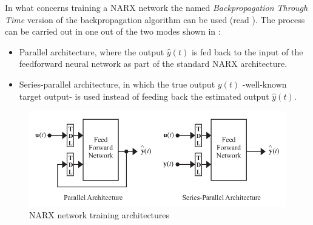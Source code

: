 
In what concerns training a NARX network the
named \emph{Backpropagation Through Time} version of the
backpropagation algorithm can be used (read ). The
process can be carried out in one out of the two modes shown
in  \cite{menezes2008long}:
\begin{itemize}
	\item Parallel architecture, where the output $\hat{y}(t)$ is
	fed back to the input of the feedforward neural network as
	part of the standard NARX architecture.  

        \item Series-parallel architecture, in which the true output
	$y(t)$ -well-known target output- is used instead of feeding
	back the estimated output $\hat{y}(t)$.
\end{itemize}

\begin{figure}[!ht]
\centering
\includegraphics[width=\textwidth]{images/narxTrainingArchitectures.png}
\caption{NARX network training architectures}
\label{fig:narxtrainingarch}
\end{figure}



